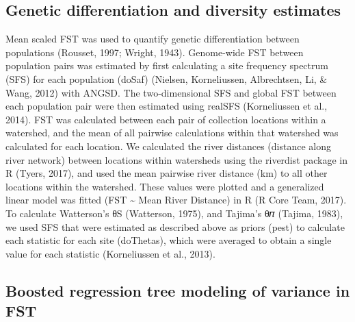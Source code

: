 \documentclass[twoside,12pt,final]{ucthesis-CA2012}
\begin{document}
\begin{ucmainmatter}
\hypertarget{genetic-differentiation-and-diversity-estimates}{%
\subsection{Genetic differentiation and diversity
estimates}\label{genetic-differentiation-and-diversity-estimates}}

Mean scaled FST was used to quantify genetic differentiation between
populations (Rousset, 1997; Wright, 1943). Genome-wide FST between
population pairs was estimated by first calculating a site frequency
spectrum (SFS) for each population (doSaf) (Nielsen, Korneliussen,
Albrechtsen, Li, \& Wang, 2012) with ANGSD. The two-dimensional SFS and
global FST between each population pair were then estimated using
realSFS (Korneliussen et al., 2014). FST was calculated between each
pair of collection locations within a watershed, and the mean of all
pairwise calculations within that watershed was calculated for each
location. We calculated the river distances (distance along river
network) between locations within watersheds using the riverdist package
in R (Tyers, 2017), and used the mean pairwise river distance (km) to
all other locations within the watershed. These values were plotted and
a generalized linear model was fitted (FST \textasciitilde{} Mean River
Distance) in R (R Core Team, 2017). To calculate Watterson's θS
(Watterson, 1975), and Tajima's θ𝜋 (Tajima, 1983), we used SFS that were
estimated as described above as priors (pest) to calculate each
statistic for each site (doThetas), which were averaged to obtain a
single value for each statistic (Korneliussen et al., 2013).

\hypertarget{boosted-regression-tree-modeling-of-variance-in-fst}{%
\subsection{Boosted regression tree modeling of variance in
FST}\label{boosted-regression-tree-modeling-of-variance-in-fst}}


\end{ucmainmatter}
\end{document}
